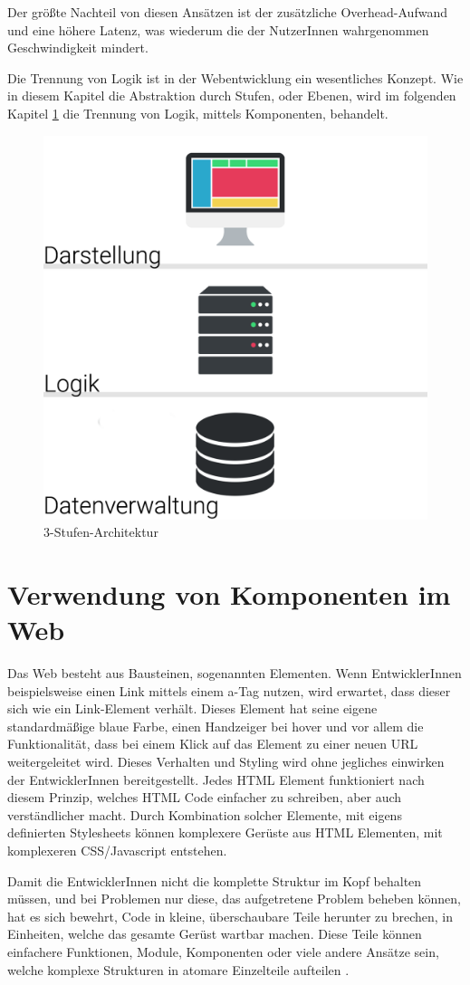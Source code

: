 Der größte Nachteil von diesen Ansätzen ist der zusätzliche Overhead-Aufwand  und eine höhere Latenz, was wiederum die der NutzerInnen wahrgenommen Geschwindigkeit mindert.

Die Trennung von Logik ist in der Webentwicklung ein wesentliches Konzept. Wie in diesem Kapitel die Abstraktion durch Stufen, oder Ebenen, wird im folgenden Kapitel \ref{cha:component_usage} die Trennung von Logik, mittels Komponenten, behandelt.

\begin{figure}
	\centering
	\includegraphics[width=0.5\linewidth]{images/3-stufen-architektur}
	\caption{3-Stufen-Architektur}
	\label{fig:3-stufen-architektur}
\end{figure}

\section{Verwendung von Komponenten im Web}
\label{cha:component_usage}
Das Web besteht aus Bausteinen, sogenannten Elementen. Wenn EntwicklerInnen beispielsweise einen Link mittels einem a-Tag nutzen, wird erwartet, dass dieser sich wie ein Link-Element verhält. Dieses Element hat seine eigene standardmäßige blaue Farbe, einen Handzeiger bei hover und vor allem die Funktionalität, dass bei einem Klick auf das Element zu einer neuen URL weitergeleitet wird. Dieses Verhalten und Styling wird ohne jegliches einwirken der EntwicklerInnen bereitgestellt. Jedes HTML Element funktioniert nach diesem Prinzip, welches HTML Code einfacher zu schreiben, aber auch verständlicher macht.
Durch Kombination solcher Elemente, mit eigens definierten Stylesheets können komplexere Gerüste aus HTML Elementen, mit komplexeren CSS/Javascript entstehen.

Damit die EntwicklerInnen nicht die komplette Struktur im Kopf behalten müssen, und bei Problemen nur diese, das aufgetretene Problem beheben können, hat es sich bewehrt, Code in kleine, überschaubare Teile herunter zu brechen, in Einheiten, welche das gesamte Gerüst wartbar machen. Diese Teile können einfachere Funktionen, Module, Komponenten oder viele andere Ansätze sein, welche komplexe Strukturen in atomare Einzelteile aufteilen \cite{components-benefit}.

